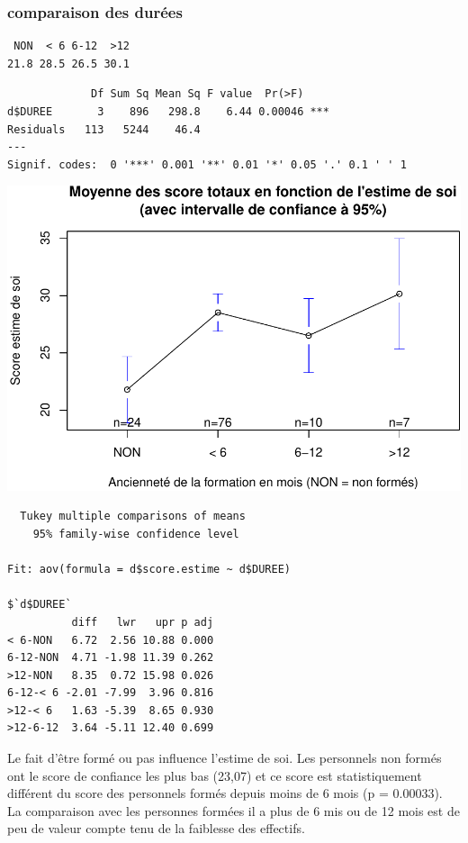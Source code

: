 \documentclass[]{article}
\begin{document}
\subsubsection{comparaison des durées}\label{comparaison-des-durees-1}

\begin{verbatim}
 NON  < 6 6-12  >12 
21.8 28.5 26.5 30.1 
\end{verbatim}

\begin{verbatim}
             Df Sum Sq Mean Sq F value  Pr(>F)    
d$DUREE       3    896   298.8    6.44 0.00046 ***
Residuals   113   5244    46.4                    
---
Signif. codes:  0 '***' 0.001 '**' 0.01 '*' 0.05 '.' 0.1 ' ' 1
\end{verbatim}

\includegraphics{analyse_files/figure-latex/unnamed-chunk-28-1.pdf}

\begin{verbatim}
  Tukey multiple comparisons of means
    95% family-wise confidence level

Fit: aov(formula = d$score.estime ~ d$DUREE)

$`d$DUREE`
          diff   lwr   upr p adj
< 6-NON   6.72  2.56 10.88 0.000
6-12-NON  4.71 -1.98 11.39 0.262
>12-NON   8.35  0.72 15.98 0.026
6-12-< 6 -2.01 -7.99  3.96 0.816
>12-< 6   1.63 -5.39  8.65 0.930
>12-6-12  3.64 -5.11 12.40 0.699
\end{verbatim}

Le fait d'être formé ou pas influence l'estime de soi. Les personnels
non formés ont le score de confiance les plus bas (23,07) et ce score
est statistiquement différent du score des personnels formés depuis
moins de 6 mois (p = 0.00033). La comparaison avec les personnes formées
il a plus de 6 mis ou de 12 mois est de peu de valeur compte tenu de la
faiblesse des effectifs.
\end{document}
